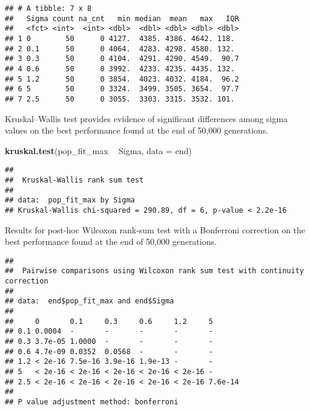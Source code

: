 \documentclass[]{book}
\newenvironment{Shaded}{\begin{snugshade}}{\end{snugshade}}
\newcommand{\DataTypeTok}[1]{\textcolor[rgb]{0.13,0.29,0.53}{#1}}
\newcommand{\KeywordTok}[1]{\textcolor[rgb]{0.13,0.29,0.53}{\textbf{#1}}}
\newcommand{\NormalTok}[1]{#1}
\newcommand{\OperatorTok}[1]{\textcolor[rgb]{0.81,0.36,0.00}{\textbf{#1}}}
\newcommand{\OtherTok}[1]{\textcolor[rgb]{0.56,0.35,0.01}{#1}}
\newcommand{\StringTok}[1]{\textcolor[rgb]{0.31,0.60,0.02}{#1}}
\begin{document}
\begin{verbatim}
## # A tibble: 7 x 8
##   Sigma count na_cnt   min median  mean   max   IQR
##   <fct> <int>  <int> <dbl>  <dbl> <dbl> <dbl> <dbl>
## 1 0        50      0 4127.  4385. 4386. 4642. 118. 
## 2 0.1      50      0 4064.  4283. 4298. 4580. 132. 
## 3 0.3      50      0 4104.  4291. 4290. 4549.  90.7
## 4 0.6      50      0 3992.  4233. 4235. 4435. 132. 
## 5 1.2      50      0 3854.  4023. 4032. 4184.  96.2
## 6 5        50      0 3324.  3499. 3505. 3654.  97.7
## 7 2.5      50      0 3055.  3303. 3315. 3532. 101.
\end{verbatim}

Kruskal--Wallis test provides evidence of significant differences among sigma values on the best performance found at the end of 50,000 generations.

\begin{Shaded}
\begin{Highlighting}[]
\KeywordTok{kruskal.test}\NormalTok{(pop_fit_max }\OperatorTok{~}\StringTok{ }\NormalTok{Sigma, }\DataTypeTok{data =}\NormalTok{ end)}
\end{Highlighting}
\end{Shaded}

\begin{verbatim}
## 
##  Kruskal-Wallis rank sum test
## 
## data:  pop_fit_max by Sigma
## Kruskal-Wallis chi-squared = 290.89, df = 6, p-value < 2.2e-16
\end{verbatim}

Results for post-hoc Wilcoxon rank-sum test with a Bonferroni correction on the best performance found at the end of 50,000 generations.

\begin{Shaded}
\end{Shaded}

\begin{verbatim}
## 
##  Pairwise comparisons using Wilcoxon rank sum test with continuity correction 
## 
## data:  end$pop_fit_max and end$Sigma 
## 
##     0       0.1     0.3     0.6     1.2     5      
## 0.1 0.0004  -       -       -       -       -      
## 0.3 3.7e-05 1.0000  -       -       -       -      
## 0.6 4.7e-09 0.0352  0.0568  -       -       -      
## 1.2 < 2e-16 7.5e-16 3.9e-16 1.9e-13 -       -      
## 5   < 2e-16 < 2e-16 < 2e-16 < 2e-16 < 2e-16 -      
## 2.5 < 2e-16 < 2e-16 < 2e-16 < 2e-16 < 2e-16 7.6e-14
## 
## P value adjustment method: bonferroni
\end{verbatim}
\end{document}
